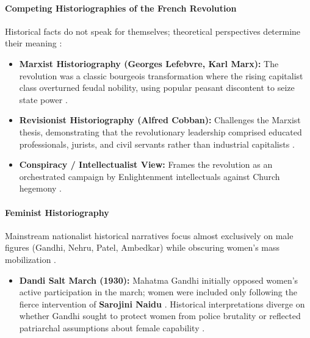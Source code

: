 \paragraph{Competing Historiographies of the French Revolution}
Historical facts do not speak for themselves; theoretical perspectives determine their meaning :
\begin{itemize}
    \item \textbf{Marxist Historiography (Georges Lefebvre, Karl Marx):} The revolution was a classic bourgeois transformation where the rising capitalist class overturned feudal nobility, using popular peasant discontent to seize state power .
    \item \textbf{Revisionist Historiography (Alfred Cobban):} Challenges the Marxist thesis, demonstrating that the revolutionary leadership comprised educated professionals, jurists, and civil servants rather than industrial capitalists .
    \item \textbf{Conspiracy / Intellectualist View:} Frames the revolution as an orchestrated campaign by Enlightenment intellectuals against Church hegemony .
\end{itemize}

\paragraph{Feminist Historiography}
\begin{CriticalPoint}
Mainstream nationalist historical narratives focus almost exclusively on male figures (Gandhi, Nehru, Patel, Ambedkar) while obscuring women's mass mobilization .
\begin{itemize}
    \item \textbf{Dandi Salt March (1930):} Mahatma Gandhi initially opposed women's active participation in the march; women were included only following the fierce intervention of \textbf{Sarojini Naidu} . Historical interpretations diverge on whether Gandhi sought to protect women from police brutality or reflected patriarchal assumptions about female capability .
\end{itemize}
\end{CriticalPoint}

